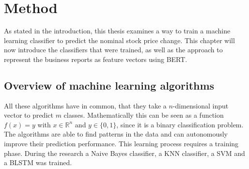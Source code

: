 \chapter{Method}\label{ch:method}

As stated in the introduction, this thesis examines a way to train a machine learning classifier to predict the nominal stock price change.
This chapter will now introduce the classifiers that were trained, as well as the approach to represent the business reports as feature vectors using \acs{BERT}.

\section{Overview of machine learning algorithms}
All these algorithms have in common, that they take a $n$-dimensional input vector to predict $m$ classes.
Mathematically this can be seen as a function $f(x)=y$ with $x\in\mathbb{R}^n$ and $y\in\{0, 1\}$, since it is a binary classification problem.
The algorithms are able to find patterns in the data and can autonomously improve their prediction performance.
This learning process requires a training phase.
During the research a Naive Bayes classifier, a \acl{KNN} classifier, a \acl{SVM} and a \acl{BLSTM} was trained.
